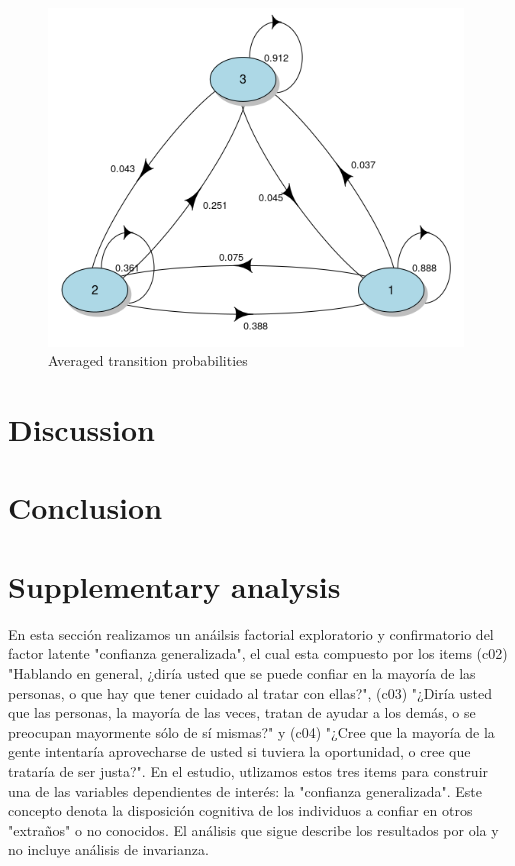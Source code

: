 \begin{figure}[htp]
    \centering
    \includegraphics[width=11cm]{output/plot_transition.png}
    \caption{Averaged transition probabilities}
        \label{fig:trans}
\end{figure}


\section{Discussion}

\section{Conclusion}


\newpage

\printbibliography

\newpage

\section{Supplementary analysis}

En esta sección realizamos un anáilsis factorial exploratorio y confirmatorio del factor latente "confianza generalizada", el cual esta compuesto por los items  (c02) "Hablando en general, ¿diría usted que se puede confiar en la mayoría de las personas, o que hay que tener cuidado al tratar con ellas?", (c03) "¿Diría usted que las personas, la mayoría de las veces, tratan de ayudar a los demás, o se preocupan mayormente sólo de sí mismas?" y (c04) "¿Cree que la mayoría de la gente intentaría aprovecharse de usted si tuviera la oportunidad, o cree que trataría de ser justa?". En el estudio, utlizamos estos tres items para construir una de las variables dependientes de interés: la "confianza generalizada". Este concepto denota la disposición cognitiva de los individuos a confiar en otros "extraños" o no conocidos. El análisis que sigue describe los resultados por ola y no incluye análisis de invarianza. 

